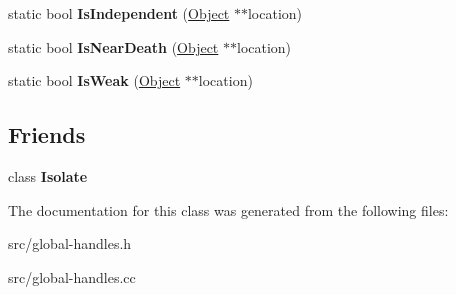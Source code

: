\begin{DoxyCompactItemize}
\item 
\hypertarget{classv8_1_1internal_1_1_global_handles_a45abfac0bcbaec6fda52170874366149}{}static bool {\bfseries Is\+Independent} (\hyperlink{classv8_1_1internal_1_1_object}{Object} $\ast$$\ast$location)\label{classv8_1_1internal_1_1_global_handles_a45abfac0bcbaec6fda52170874366149}

\item 
\hypertarget{classv8_1_1internal_1_1_global_handles_a798d33f9c686920efb58b0ce72a9049f}{}static bool {\bfseries Is\+Near\+Death} (\hyperlink{classv8_1_1internal_1_1_object}{Object} $\ast$$\ast$location)\label{classv8_1_1internal_1_1_global_handles_a798d33f9c686920efb58b0ce72a9049f}

\item 
\hypertarget{classv8_1_1internal_1_1_global_handles_a35794e5e5f0363693440ca6b53c7e399}{}static bool {\bfseries Is\+Weak} (\hyperlink{classv8_1_1internal_1_1_object}{Object} $\ast$$\ast$location)\label{classv8_1_1internal_1_1_global_handles_a35794e5e5f0363693440ca6b53c7e399}

\end{DoxyCompactItemize}
\subsection*{Friends}
\begin{DoxyCompactItemize}
\item 
\hypertarget{classv8_1_1internal_1_1_global_handles_aba4f0964bdacf2bbf62cf876e5d28d0a}{}class {\bfseries Isolate}\label{classv8_1_1internal_1_1_global_handles_aba4f0964bdacf2bbf62cf876e5d28d0a}

\end{DoxyCompactItemize}


The documentation for this class was generated from the following files\+:\begin{DoxyCompactItemize}
\item 
src/global-\/handles.\+h\item 
src/global-\/handles.\+cc\end{DoxyCompactItemize}

